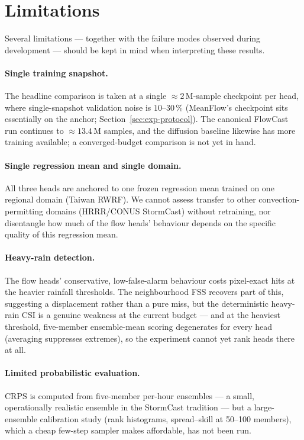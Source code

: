 \section{Limitations}
\label{sec:concl-limitations}

Several limitations --- together with the failure modes observed during development --- should be kept in mind when interpreting these results.

\paragraph{Single training snapshot.} The headline comparison is taken at a single $\approx 2\,\text{M}$-sample checkpoint per head, where single-snapshot validation noise is $10$--$30\,\%$ (MeanFlow's checkpoint sits essentially on the anchor; Section~\ref{sec:exp-protocol}). The canonical FlowCast run continues to $\approx 13.4\,\text{M}$ samples, and the diffusion baseline likewise has more training available; a converged-budget comparison is not yet in hand.

\paragraph{Single regression mean and single domain.} All three heads are anchored to one frozen regression mean trained on one regional domain (Taiwan RWRF). We cannot assess transfer to other convection-permitting domains (HRRR/CONUS StormCast) without retraining, nor disentangle how much of the flow heads' behaviour depends on the specific quality of this regression mean.

\paragraph{Heavy-rain detection.} The flow heads' conservative, low-false-alarm behaviour costs pixel-exact hits at the heavier rainfall thresholds. The neighbourhood FSS recovers part of this, suggesting a displacement rather than a pure miss, but the deterministic heavy-rain CSI is a genuine weakness at the current budget --- and at the heaviest threshold, five-member ensemble-mean scoring degenerates for every head (averaging suppresses extremes), so the experiment cannot yet rank heads there at all.

\paragraph{Limited probabilistic evaluation.} CRPS is computed from five-member per-hour ensembles --- a small, operationally realistic ensemble in the StormCast tradition --- but a large-ensemble calibration study (rank histograms, spread--skill at 50--100 members), which a cheap few-step sampler makes affordable, has not been run.

